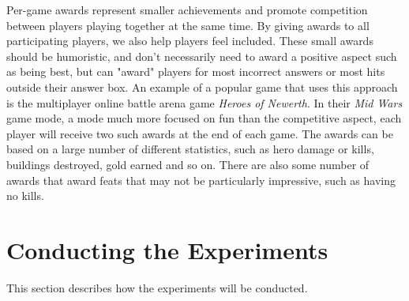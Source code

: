 Per-game awards represent smaller achievements and promote competition between players playing together at the same time. By giving awards to all participating players, we also help players feel included. These small awards should be humoristic, and don't necessarily need to award a positive aspect such as being best, but can "award" players for most incorrect answers or most hits outside their answer box. An example of a popular game that uses this approach is the multiplayer online battle arena game \emph{Heroes of Newerth}\citep{Newerth}. In their \emph{Mid Wars} game mode, a mode much more focused on fun than the competitive aspect, each player will receive two such awards at the end of each game. The awards can be based on a large number of different statistics, such as hero damage or kills, buildings destroyed, gold earned and so on\citep{MidWars}. There are also some number of awards that award feats that may not be particularly impressive, such as having no kills.


\section{Conducting the Experiments}

This section describes how the experiments will be conducted.